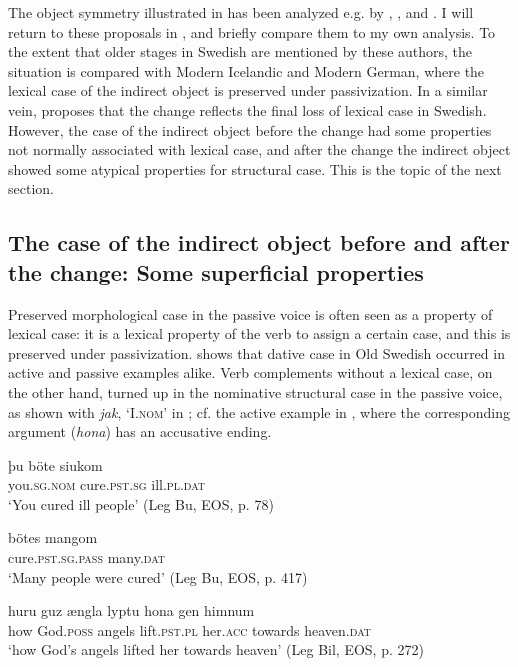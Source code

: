 \documentclass[output=paper]{langscibook}
\begin{document}
The object symmetry illustrated in  has been analyzed e.g. by \citet{HolmbergPlatzack1995}, \citet{Platzack2005,Platzack2006}, and \citet{HaddicanHolmberg2019}. I will return to these proposals in , and briefly compare them to my own analysis. To the extent that older stages in Swedish are mentioned by these authors, the situation is compared with Modern Icelandic and Modern German, where the lexical case of the indirect object is preserved under passivization. In a similar vein, \citet{Falk1995, Falk1997} proposes that the change reflects the final loss of lexical case in Swedish. However, the case of the indirect object before the change had some properties not normally associated with lexical case, and after the change the indirect object showed some atypical properties for structural case. This is the topic of the next section.


\subsection{The case of the indirect object before and after the change: Some superficial properties}\label{sec:falk:2.2}


Preserved morphological case in the passive voice is often seen as a property of lexical case: it is a lexical property of the verb to assign a certain case, and this is preserved under passivization.  shows that dative case in Old Swedish occurred in active  and passive  examples alike. Verb complements without a lexical case, on the other hand, turned up in the nominative structural case in the passive voice, as shown with \textit{jak}, ‘I.\textsc{nom}’ in ; cf. the active example in , where the corresponding argument (\textit{hona}) has an accusative ending.

\ea%
    \label{ex:falk:3}
\ea\label{ex:falk:3a}
\gll þu              böte          siukom\\
      you.\textsc{sg.nom}  cure.\textsc{pst.sg}    ill.\textsc{pl}.\textsc{dat}\\
\glt ‘You cured ill people’ (Leg Bu, EOS, p. 78)

\ex\label{ex:falk:3b}
\gll bötes            mangom\\
      cure.\textsc{pst.sg.pass}  many.\textsc{dat}\\
\glt ‘Many people were cured’ (Leg Bu, EOS, p. 417)
\z
\ex%
    \label{ex:falk:4}

\ea\label{ex:falk:4a}
\gll huru  guz      ængla  lyptu      hona    gen    himnum\\
      how  God.\textsc{poss}  angels  lift.\textsc{pst}.\textsc{pl}  her.\textsc{acc}  towards  heaven.\textsc{dat}\\
\glt ‘how God’s angels lifted her towards heaven’ (Leg Bil, EOS, p. 272)
\end{document}
